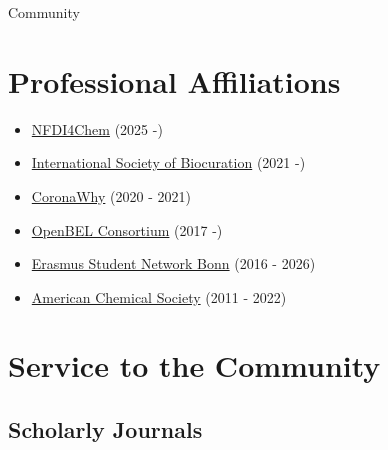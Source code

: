 \documentclass[10pt,a4paper,sans]{moderncv} %
\begin{document}
\begin{enumerate}
    \end{enumerate}


\pagebreak
{\huge Community}

    \section{Professional Affiliations}\label{sec:affiliations}
    \begin{itemize}
        \item     \href{https://bioregistry.io/wikidata:Q96678459}{NFDI4Chem} (2025 -)

        \item     \href{https://bioregistry.io/wikidata:Q23809291}{International Society of Biocuration} (2021 -)

        \item     \href{https://bioregistry.io/wikidata:Q95587147}{CoronaWhy} (2020 - 2021)

        \item     \href{https://bioregistry.io/wikidata:}{OpenBEL Consortium} (2017 -)

        \item     \href{https://bioregistry.io/wikidata:Q655757}{Erasmus Student Network Bonn} (2016 - 2026)

        \item     \href{https://bioregistry.io/wikidata:Q247556}{American Chemical Society} (2011 - 2022)

    \end{itemize}

\section{Service to the Community}\label{sec:service}

\subsection{Scholarly Journals}\label{sec:journals}
\end{document}

